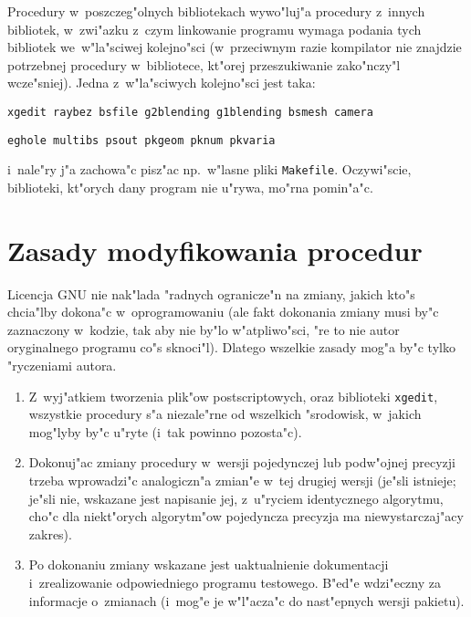 Procedury w~poszczeg"olnych bibliotekach wywo"luj"a procedury z~innych
bibliotek, w~zwi"azku z~czym linkowanie programu wymaga podania tych
bibliotek we~w"la"sciwej kolejno"sci (w~przeciwnym razie kompilator nie
znajdzie potrzebnej procedury w~bibliotece, kt"orej przeszukiwanie
zako"nczy"l wcze"sniej). Jedna z~w"la"sciwych kolejno"sci jest taka:

\vspace{\medskipamount}
\centerline{\texttt{xgedit raybez bsfile g2blending g1blending bsmesh camera}}

\centerline{\texttt{eghole multibs psout pkgeom pknum pkvaria}}
\vspace{\medskipamount}

\noindent
i~nale"ry j"a zachowa"c pisz"ac np.\ w"lasne pliki \texttt{Makefile}.
Oczywi"scie, biblioteki, kt"orych dany program nie u"rywa, mo"rna pomin"a"c.


\section{Zasady modyfikowania procedur}

Licencja GNU nie nak"lada "radnych ogranicze"n na zmiany, jakich kto"s
chcia"lby dokona"c w~oprogramowaniu (ale fakt dokonania zmiany musi by"c
zaznaczony w~kodzie, tak aby nie by"lo w"atpliwo"sci, "re to nie autor
oryginalnego programu co"s sknoci"l). Dlatego wszelkie zasady mog"a by"c
tylko "ryczeniami autora.
\begin{enumerate}
\item\begin{sloppypar}
  Z~wyj"atkiem tworzenia plik"ow postscriptowych, oraz biblioteki
  \texttt{xgedit}, wszystkie procedury s"a niezale"rne od wszelkich "srodowisk,
  w~jakich mog"lyby by"c u"ryte (i~tak powinno pozosta"c).%
  \end{sloppypar}
\item Dokonuj"ac zmiany procedury w~wersji pojedynczej lub podw"ojnej
  precyzji trzeba wprowadzi"c analogiczn"a zmian"e w~tej drugiej wersji
  (je"sli istnieje; je"sli nie, wskazane jest napisanie jej, z~u"ryciem
  identycznego algorytmu, cho"c dla niekt"orych algorytm"ow pojedyncza
  precyzja ma niewystarczaj"acy zakres).
\item Po dokonaniu zmiany wskazane jest uaktualnienie dokumentacji
  i~zrealizowanie odpowiedniego programu testowego. B"ed"e wdzi"eczny
  za informacje o~zmianach (i~mog"e je w"l"acza"c do nast"epnych wersji
  pakietu).
\end{enumerate}

